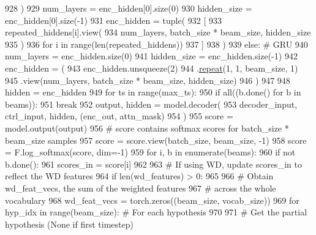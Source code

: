 \begin{DoxyCode}
928                 )
929             num\_layers = enc\_hidden[0].size(0)
930             hidden\_size = enc\_hidden[0].size(-1)
931             enc\_hidden = tuple(
932                 [
933                     repeated\_hiddens[i].view(
934                         num\_layers, batch\_size * beam\_size, hidden\_size
935                     )
936                     \textcolor{keywordflow}{for} i \textcolor{keywordflow}{in} range(len(repeated\_hiddens))
937                 ]
938             )
939         \textcolor{keywordflow}{else}:  \textcolor{comment}{# GRU}
940             num\_layers = enc\_hidden.size(0)
941             hidden\_size = enc\_hidden.size(-1)
942             enc\_hidden = (
943                 enc\_hidden.unsqueeze(2)
944                 .\hyperlink{namespacerepeat}{repeat}(1, 1, beam\_size, 1)
945                 .view(num\_layers, batch\_size * beam\_size, hidden\_size)
946             )
947 
948         hidden = enc\_hidden
949         \textcolor{keywordflow}{for} ts \textcolor{keywordflow}{in} range(max\_ts):
950             \textcolor{keywordflow}{if} all((b.done() \textcolor{keywordflow}{for} b \textcolor{keywordflow}{in} beams)):
951                 \textcolor{keywordflow}{break}
952             output, hidden = model.decoder(
953                 decoder\_input, ctrl\_input, hidden, (enc\_out, attn\_mask)
954             )
955             score = model.output(output)
956             \textcolor{comment}{# score contains softmax scores for batch\_size * beam\_size samples}
957             score = score.view(batch\_size, beam\_size, -1)
958             score = F.log\_softmax(score, dim=-1)
959             \textcolor{keywordflow}{for} i, b \textcolor{keywordflow}{in} enumerate(beams):
960                 \textcolor{keywordflow}{if} \textcolor{keywordflow}{not} b.done():
961                     scores\_in = score[i]
962 
963                     \textcolor{comment}{# If using WD, update scores\_in to reflect the WD features}
964                     \textcolor{keywordflow}{if} len(wd\_features) > 0:
965 
966                         \textcolor{comment}{# Obtain wd\_feat\_vecs, the sum of the weighted features}
967                         \textcolor{comment}{# across the whole vocabulary}
968                         wd\_feat\_vecs = torch.zeros((beam\_size, vocab\_size))
969                         \textcolor{keywordflow}{for} hyp\_idx \textcolor{keywordflow}{in} range(beam\_size):  \textcolor{comment}{# For each hypothesis}
970 
971                             \textcolor{comment}{# Get the partial hypothesis (None if first timestep)}

\end{DoxyCode}
